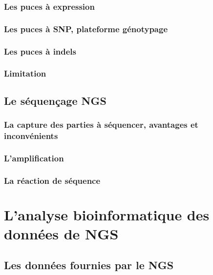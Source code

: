 \documentclass[12pt,twoside]{ugathesis}
\begin{document}
\subsubsection{Les puces à expression}\label{les-puces-a-expression}

\subsubsection{Les puces à SNP, plateforme
génotypage}\label{les-puces-a-snp-plateforme-genotypage}

\subsubsection{Les puces à indels}\label{les-puces-a-indels}

\subsubsection{Limitation}\label{limitation}

\subsection{Le séquençage NGS}\label{ngs}

\subsubsection{La capture des parties à séquencer, avantages et
inconvénients}\label{la-capture-des-parties-a-sequencer-avantages-et-inconvenients}

\subsubsection{L'amplification}\label{lamplification}

\subsubsection{La réaction de séquence}\label{la-reaction-de-sequence}

\section{L'analyse bioinformatique des données de
NGS}\label{lanalyse-bioinformatique-des-donnees-de-ngs}

\subsection{Les données fournies par le
NGS}\label{les-donnees-fournies-par-le-ngs}
\end{document}
